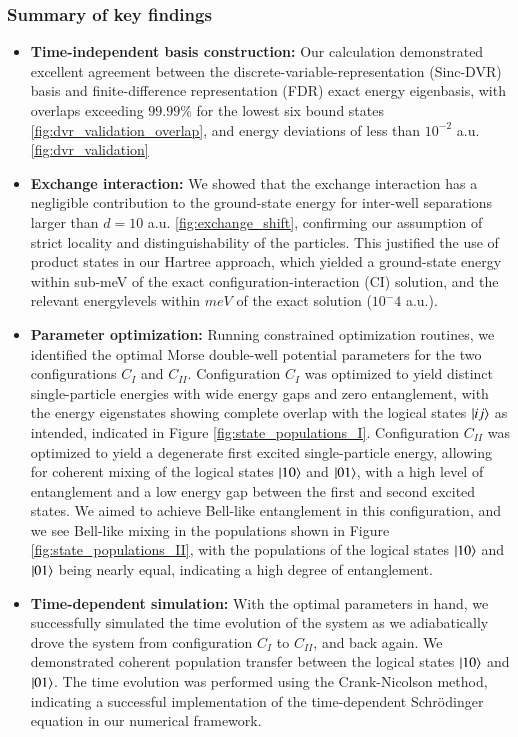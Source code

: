 \documentclass{subfiles}
\begin{document}
\subsubsection*{Summary of key findings}
\begin{itemize}
    \item \textbf{Time-independent basis construction:} Our calculation demonstrated excellent agreement between the discrete-variable-representation (Sinc-DVR) basis and finite-difference representation (FDR) exact energy eigenbasis, with overlaps exceeding $99.99\%$ for the lowest six bound states \ref{fig:dvr_validation_overlap}, and energy deviations of less than $10^{-2}$ a.u. \ref{fig:dvr_validation}
    \item \textbf{Exchange interaction:} We showed that the exchange interaction has a negligible contribution to the ground-state energy for inter-well separations larger than $d = 10$ a.u. \ref{fig:exchange_shift}, confirming our assumption of strict locality and distinguishability of the particles. This justified the use of product states in our Hartree approach, which yielded a ground-state energy within sub-meV of the exact configuration-interaction (CI) solution, and the relevant energylevels within $meV$ of the exact solution ($10^-4$ a.u.).
    \item \textbf{Parameter optimization:} Running constrained optimization routines, we identified the optimal Morse double-well potential parameters for the two configurations $C_I$ and $C_{II}$. Configuration $C_I$ was optimized to yield distinct single-particle energies with wide energy gaps and zero entanglement, with the energy eigenstates showing complete overlap with the logical states $\ket{ij}$ as intended, indicated in Figure \ref{fig:state_populations_I}. Configuration $C_{II}$ was optimized to yield a degenerate first excited single-particle energy, allowing for coherent mixing of the logical states $\ket{10}$ and $\ket{01}$, with a high level of entanglement and a low energy gap between the first and second excited states. We aimed to achieve Bell-like entanglement in this configuration, and we see Bell-like mixing in the populations shown in Figure \ref{fig:state_populations_II}, with the populations of the logical states $\ket{10}$ and $\ket{01}$ being nearly equal, indicating a high degree of entanglement.
    \item \textbf{Time-dependent simulation:} With the optimal parameters in hand, we successfully simulated the time evolution of the system as we adiabatically drove the system from configuration $C_I$ to $C_{II}$, and back again. We demonstrated coherent population transfer between the logical states $\ket{10}$ and $\ket{01}$. The time evolution was performed using the Crank-Nicolson method, indicating a successful implementation of the time-dependent Schrödinger equation in our numerical framework. 

\end{itemize}
\end{document}
